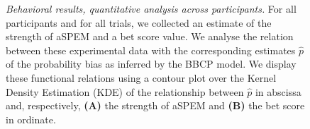 \documentclass[12pt,english]{article}%
\newcommand{\seeFig}[1]{Figure~\ref{fig:#1}}
\begin{document}
\begin{figure}%
\caption{%
\emph{Behavioral results, quantitative analysis across participants.} %
For all participants and for all trials, we collected an estimate of
the strength of aSPEM and a bet score value.
We analyse the relation between these experimental data with the corresponding estimates $\hat{p}$
of the probability bias as inferred by the BBCP model.
We display these functional relations using a contour plot over 
the Kernel Density Estimation (KDE) of the relationship between $\hat{p}$ in abscissa
and, respectively, \textbf{(A)} the strength of aSPEM and \textbf{(B)} the bet score in ordinate.
}
\end{figure}
\end{document}
